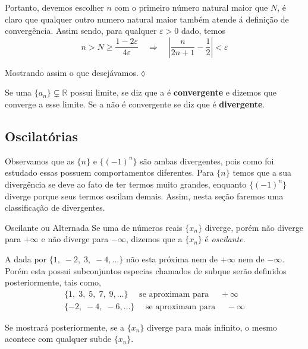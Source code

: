 Portanto, devemos escolher $n$ com o primeiro n\'{u}mero natural maior que $N$, \'{e} claro que qualquer outro numero natural maior tamb\'{e}m atende \'{a} defini\c{c}\~{a}o de converg\^{e}ncia. Assim sendo, para qualquer $\varepsilon>0$ dado, temos
\begin{equation*}
n>N\geq \frac{1-2\varepsilon}{4\varepsilon}\quad  \Rightarrow \quad
\left|\frac{n}{2n+1}-\frac{1}{2}\right|<\varepsilon
\end{equation*}

Mostrando assim o que desejávamos.\hfill \(\lozenge\)

\begin{obs}\label{imp001}
Se uma \seq $\{a_n\}\subsetneq \mathbb{R}$ possui limite, se diz que a \seq \'{e} \textbf{convergente} e dizemos que  converge a esse
limite. Se a \seq n\~{a}o \'{e} convergente se diz que \'{e} \textbf{divergente}.
\end{obs}

\subsection{\Seqs Oscilat\'{o}rias}
Observamos que as \seqs $\{ n\}$ e $\{(-1)^n\}$ s\~{a}o ambas  divergentes, pois como foi  estudado essas \seqs possuem comportamentos diferentes. Para \seq $\{n\}$ temos que a sua diverg\^{e}ncia se deve ao fato de ter termos muito grandes, enquanto $\{(-1)^n\}$ diverge porque seus termos oscilam demais. Assim, nesta se\c{c}\~{a}o faremos uma classifica\c{c}\~{a}o de \seqs divergentes.

\begin{defic}{Oscilante ou Alternada}{}
Se uma \seq de n\'{u}meros reais $\{x_n\}$ diverge, por\'{e}m n\~{a}o diverge para $+\infty$ e n\~{a}o diverge para $-\infty$, dizemos que a \seq $\{ x_n \}$ \'{e} \emph{oscilante}.
\end{defic}

A \seq dada por $\{1,\; -2,\; 3,\; -4,\ldots \}$ n\~{a}o esta pr\'{o}xima nem de $+\infty$ nem de $-\infty$. Por\'{e}m esta \seq possui subconjuntos especias chamados de sub\seqs que ser\~{a}o definidos posteriormente, tais como,
\begin{align*}
    \{1,\; 3,\; 5,\; 7,\; 9,\ldots \}\quad \text{ se aproximam  para } \quad +\infty\\[2ex]
    \{-2,\; -4,\; -6,\ldots \}\quad \text{ se aproximam  para } \quad -\infty
\end{align*}

Se mostrar\'{a} posteriormente, se a \seq $\{x_n\}$ diverge para mais infinito, o mesmo acontece com qualquer 
sub\seq  de $\{x_n\}$.

